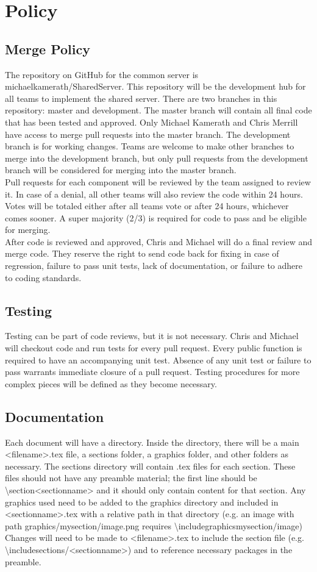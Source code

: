 \section*{Policy}
\subsection*{Merge Policy}
The repository on GitHub for the common server is michaelkamerath/SharedServer. This repository will be the development hub for all teams to implement the shared server. There are two branches in this repository: master and development. The master branch will contain all final code that has been tested and approved. Only Michael Kamerath and Chris Merrill have access to merge pull requests into the master branch. The development branch is for working changes. Teams are welcome to make other branches to merge into the development branch, but only pull requests from the development branch will be considered for merging into the master branch.\\
Pull requests for each component will be reviewed by the team assigned to review it. In case of a denial, all other teams will also review the code within 24 hours. Votes will be totaled either after all teams vote or after 24 hours, whichever comes sooner. A super majority (2/3) is required for code to pass and be eligible for merging.\\
After code is reviewed and approved, Chris and Michael will do a final review and merge code. They reserve the right to send code back for fixing in case of regression, failure to pass unit tests, lack of documentation, or failure to adhere to coding standards.
\subsection*{Testing}
Testing can be part of code reviews, but it is not necessary. Chris and Michael will checkout code and run tests for every pull request. Every public function is required to have an accompanying unit test. Absence of any unit test or failure to pass warrants immediate closure of a pull request. Testing procedures for more complex pieces will be defined as they become necessary.
\subsection*{Documentation}
Each document will have a directory. Inside the directory, there will be a main <filename>.tex file, a sections folder, a graphics folder, and other folders as necessary. The sections directory will contain .tex files for each section. These files should not have any preamble material; the first line should be \textbackslash section{<sectionname>} and it should only contain content for that section. Any graphics used need to be added to the graphics directory and included in <sectionname>.tex with a relative path in that directory (e.g. an image with path graphics/mysection/image.png requires \textbackslash includegraphics{mysection/image}) Changes will need to be made to <filename>.tex to include the section file (e.g. \textbackslash include{sections/<sectionname>}) and to reference necessary packages in the preamble.
